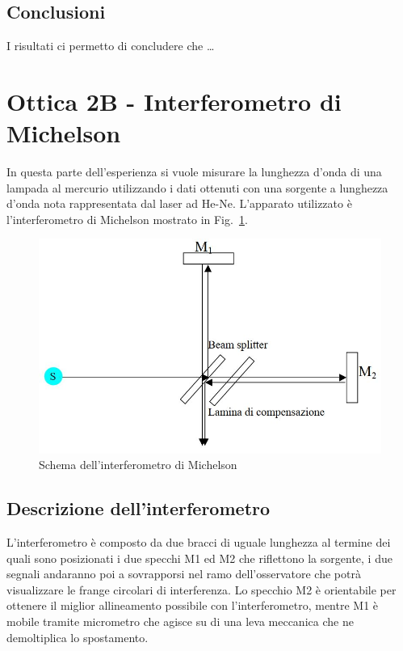 \documentclass[10pt,a4paper]{article}
\begin{document}
\subsection*{Conclusioni}
I risultati ci permetto di concludere che \dots
\newpage
\section*{Ottica 2B - Interferometro di Michelson}
In questa parte dell'esperienza si vuole misurare la lunghezza d'onda di una lampada al mercurio utilizzando i dati ottenuti con una sorgente a lunghezza d'onda nota rappresentata dal laser ad He-Ne. L'apparato utilizzato è l'interferometro di Michelson mostrato in Fig.~\ref{fig:int}.
\begin{figure}[h]
	\centering
	\includegraphics[scale=0.6]{interferometro}
	\caption{Schema dell'interferometro di Michelson}
	\label{fig:int}
\end{figure}
 
 \subsection*{Descrizione dell'interferometro}
 L'interferometro è composto da due bracci di uguale lunghezza al termine dei quali sono posizionati i due specchi M1 ed M2 che riflettono la sorgente, i due segnali andaranno poi a sovrapporsi nel ramo dell'osservatore che potrà visualizzare le frange circolari di interferenza. Lo specchio M2 è orientabile per ottenere il miglior allineamento possibile con l'interferometro, mentre M1 è mobile tramite micrometro che agisce su di una leva meccanica che ne demoltiplica lo spostamento.
 
\end{document}
